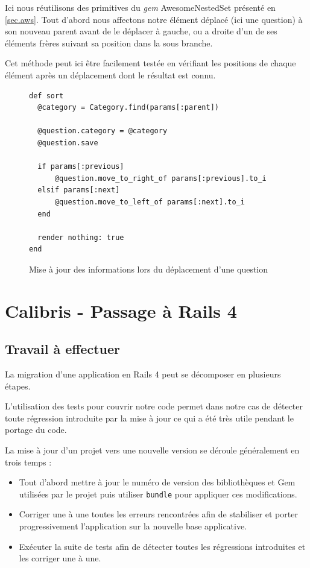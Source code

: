 \documentclass[12pt,a4paper]{book}
\begin{document}
Ici nous réutilisons des primitives du \textit{gem} AwesomeNestedSet présenté en \cref{sec.aws}. Tout d'abord nous affectons notre élément déplacé (ici une question) à son nouveau parent avant de le déplacer à gauche, ou a droite d'un de ses éléments frères suivant sa position dans la sous branche.

Cet méthode peut ici être facilement testée en vérifiant les positions de chaque élément après un déplacement dont le résultat est connu.

\begin{figure}[h]
\lstset{language=ruby}
\begin{lstlisting}
def sort
  @category = Category.find(params[:parent])

  @question.category = @category
  @question.save

  if params[:previous]
      @question.move_to_right_of params[:previous].to_i
  elsif params[:next]
      @question.move_to_left_of params[:next].to_i
  end

  render nothing: true
end
\end{lstlisting}
 \caption{Mise à jour des informations lors du déplacement d'une question}
 \label{fig.sort3}
\end{figure}

\section{Calibris - Passage à Rails 4} 

\label{section.rails4_dev}

\subsection{Travail à effectuer}

La migration d'une application en Rails 4 peut se décomposer en plusieurs étapes. 

L'utilisation des tests pour couvrir notre code permet dans notre cas de détecter toute régression introduite par la mise à jour ce qui a été très utile pendant le portage du code.

La mise à jour d'un projet vers une nouvelle version se déroule généralement en trois temps :
\begin{itemize}
  \item Tout d'abord mettre à jour le numéro de version des bibliothèques et Gem utilisées par le projet puis utiliser \texttt{bundle} pour appliquer ces modifications.
  \item Corriger une à une toutes les erreurs rencontrées afin de stabiliser et porter progressivement l'application sur la nouvelle base applicative.
  \item Exécuter la suite de tests afin de détecter toutes les régressions introduites et les corriger une à une.
\end{itemize}
\end{document}
